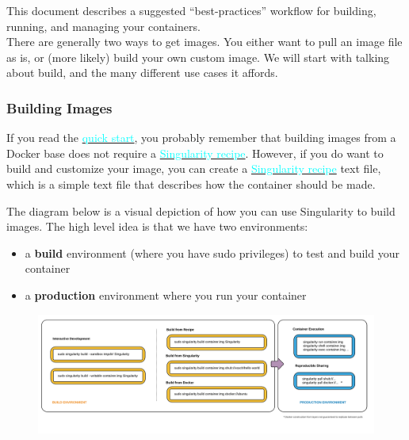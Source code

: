 \documentclass[a4paper]{article}
\newcounter{subsubsubsection}[subsubsection]
\begin{document}
This document describes a suggested “best-practices” workflow for building, running, and managing your containers.\\[0.1in]
There are generally two ways to get images. You either want to pull an image file as is, or (more likely) build your own custom image. We will start with talking about build, and the many different use cases it affords.


\label{sec:singularityflow}
\subsubsection{Building Images}

If you read the \hyperref[sec:quickstart]{{\textcolor{cyan}{quick start}}}, you probably remember that building images from a Docker base does not require a \hyperref[sec:recipefile]{{\textcolor{cyan}{Singularity recipe}}}. However, if you do want to build and customize your image, you can create a \hyperref[sec:recipefile]{{\textcolor{cyan}{Singularity recipe}}} text file, which is a simple text file that describes how the container should be made.\\[0.1in]


	The diagram below is a visual depiction of how you can use Singularity to build images. The high level idea is that we have two environments:
	
	\begin{itemize}
	\item a \textbf{build} environment (where you have sudo privileges) to test and build your container
	\item a \textbf{production} environment where you run your container
\end{itemize}

\begin{figure}[h]
\centering
\hspace*{-0.62in}
{\includegraphics[scale=0.168]{assets/img/flow.png}}
\end{figure}
\end{document}
